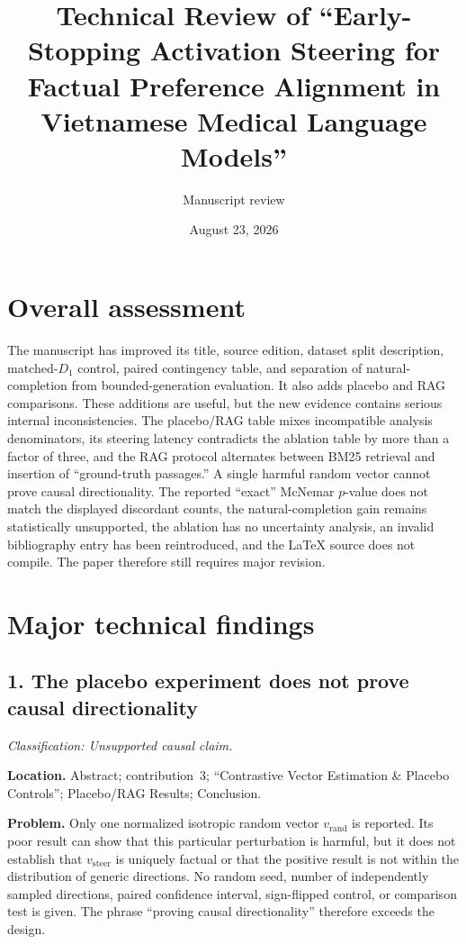 \documentclass[11pt]{article}
\title{Technical Review of ``Early-Stopping Activation Steering for Factual Preference Alignment in Vietnamese Medical Language Models''}
\author{Manuscript review}
\date{August 23, 2026}
\newcommand{\findinglabel}[1]{\textbf{#1}}
\newcommand{\classification}[1]{\textit{Classification: #1.}}
\begin{document}
\maketitle

\section*{Overall assessment}

The manuscript has improved its title, source edition, dataset split description, matched-$D_1$ control, paired contingency table, and separation of natural-completion from bounded-generation evaluation.  It also adds placebo and RAG comparisons.  These additions are useful, but the new evidence contains serious internal inconsistencies.  The placebo/RAG table mixes incompatible analysis denominators, its steering latency contradicts the ablation table by more than a factor of three, and the RAG protocol alternates between BM25 retrieval and insertion of ``ground-truth passages.''  A single harmful random vector cannot prove causal directionality.  The reported ``exact'' McNemar $p$-value does not match the displayed discordant counts, the natural-completion gain remains statistically unsupported, the ablation has no uncertainty analysis, an invalid bibliography entry has been reintroduced, and the LaTeX source does not compile.  The paper therefore still requires major revision.

\section*{Major technical findings}

\subsection*{1. The placebo experiment does not prove causal directionality}

\classification{Unsupported causal claim}

\findinglabel{Location.} Abstract; contribution~3; ``Contrastive Vector Estimation \& Placebo Controls''; Placebo/RAG Results; Conclusion.

\findinglabel{Problem.} Only one normalized isotropic random vector $v_{\mathrm{rand}}$ is reported.  Its poor result can show that this particular perturbation is harmful, but it does not establish that $v_{\mathrm{steer}}$ is uniquely factual or that the positive result is not within the distribution of generic directions.  No random seed, number of independently sampled directions, paired confidence interval, sign-flipped control, or comparison test is given.  The phrase ``proving causal directionality'' therefore exceeds the design.
\end{document}
